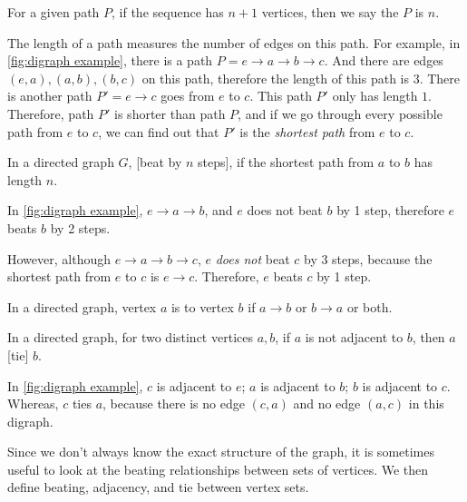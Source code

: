   \begin{definition}
    For a given path \(P\), if the sequence has \(n + 1\) vertices,
    then we say the  \(P\) is \(n\).
  \end{definition}

  The length of a path measures the number of edges on this path.
  For example, in \cref{fig:digraph example},
  there is a path \(P = e \to a \to b \to c\).
  And there are edges \((e, a), (a, b), (b, c)\) on this path,
  therefore the length of this path is 3.
  There is another path \(P' = e \to c\) goes from \(e\) to \(c\).
  This path \(P'\) only has length \(1\).
  Therefore, path \(P'\) is shorter than path \(P\),
  and if we go through every possible path from \(e\) to \(c\),
  we can find out that \(P'\) is the \emph{shortest path}
  from \(e\) to \(c\).

  \begin{definition}
    In a directed graph \(G\),
    [beat by \(n\) steps],
    if the shortest path from \(a\) to \(b\) has length \(n\).
  \end{definition}

  In \cref{fig:digraph example},
  \(e \to a \to b\),
  and \(e\) does not beat \(b\) by 1 step,
  therefore \(e\) beats \(b\) by 2 steps.

  However, although \(e \to a \to b \to c\),
  \(e\) \emph{does not} beat \(c\) by 3 steps,
  because the shortest path from \(e\) to \(c\) is \(e \to c\).
  Therefore, \(e\) beats \(c\) by 1 step.

  \begin{definition}
    In a directed graph, vertex \(a\) is  to vertex \(b\) if
    \(a \to b\) or \(b \to a\) or both.
  \end{definition}

  \begin{definition}
    In a directed graph, for two distinct vertices \(a, b\),
    if \(a\) is not adjacent to \(b\),
     then \(a\) [tie] \(b\).
  \end{definition}

  In \cref{fig:digraph example}, \(c\) is adjacent to \(e\);
  \(a\) is adjacent to \(b\); \(b\) is adjacent to \(c\).
  Whereas, \(c\) ties \(a\),
  because there is no edge \((c, a)\) and no edge \((a, c)\)
  in this digraph.

  Since we don't always know the exact structure of the graph,
  it is sometimes useful to look at
  the beating relationships between sets of vertices.
  We then define beating, adjacency, and tie between vertex sets.

